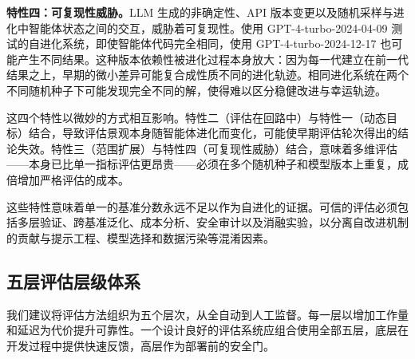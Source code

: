 \textbf{特性四：可复现性威胁。}LLM 生成的非确定性、API 版本变更以及随机采样与进化中智能体状态之间的交互，威胁着可复现性。使用 GPT-4-turbo-2024-04-09 测试的自进化系统，即使智能体代码完全相同，使用 GPT-4-turbo-2024-12-17 也可能产生不同结果。这种版本依赖性被进化过程本身放大：因为每一代建立在前一代结果之上，早期的微小差异可能复合成性质不同的进化轨迹。相同进化系统在两个不同随机种子下可能发现完全不同的解，使得难以区分稳健改进与幸运轨迹。

这四个特性以微妙的方式相互影响。特性二（评估在回路中）与特性一（动态目标）结合，导致评估景观本身随智能体进化而变化，可能使早期评估轮次得出的结论失效。特性三（范围扩展）与特性四（可复现性威胁）结合，意味着多维评估——本身已比单一指标评估更昂贵——必须在多个随机种子和模型版本上重复，成倍增加严格评估的成本。

这些特性意味着单一的基准分数永远不足以作为自进化的证据。可信的评估必须包括多层验证、跨基准泛化、成本分析、安全审计以及消融实验，以分离自改进机制的贡献与提示工程、模型选择和数据污染等混淆因素。


\subsection{五层评估层级体系}
\label{sec:eval-hierarchy}

我们建议将评估方法组织为五个层次，从全自动到人工监督。每一层以增加工作量和延迟为代价提升可靠性。一个设计良好的评估系统应组合使用全部五层，底层在开发过程中提供快速反馈，高层作为部署前的安全门。

